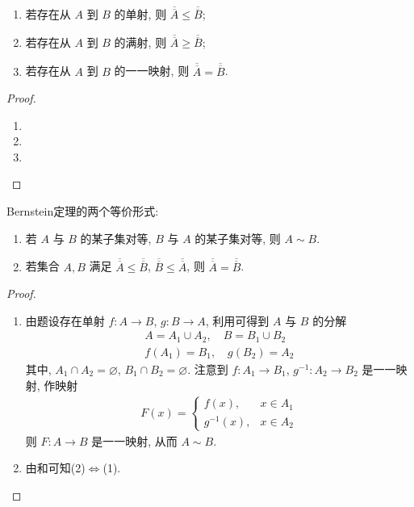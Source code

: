 \documentclass[../../main.tex]{subfiles}
\begin{document}
\begin{proposition}[映射与基数之间的关系]\label{proposition:映射与基数之间的关系}
\begin{enumerate}[(1)]
\item 若存在从 $A$ 到 $B$ 的单射, 则 $\overline{\overline{A}} \leqslant \overline{\overline{B}}$;
\item 若存在从 $A$ 到 $B$ 的满射, 则 $\overline{\overline{A}} \geqslant \overline{\overline{B}}$;
\item 若存在从 $A$ 到 $B$ 的一一映射, 则 $\overline{\overline{A}} = \overline{\overline{B}}$.
\end{enumerate}
\end{proposition}
\begin{proof}
\begin{enumerate}[(1)]
\item 

\item 

\item 
\end{enumerate}
\end{proof}

\begin{theorem}[Bernstein定理]\label{theorem:Bernstein定理}
Bernstein定理的两个等价形式:
\begin{enumerate}[(1)]
\item 若 $A$ 与 $B$ 的某子集对等, $B$ 与 $A$ 的某子集对等, 则 $A \sim B$.

\item 若集合 $A, B$ 满足 $\overline{\overline{A}} \leqslant \overline{\overline{B}}$, $\overline{\overline{B}} \leqslant \overline{\overline{A}}$, 则 $\overline{\overline{A}} = \overline{\overline{B}}$. 
\end{enumerate}
\end{theorem}
\begin{proof}
\begin{enumerate}[(1)]
\item 由题设存在单射 $f : A \to B$, $g : B \to A$, 利用可得到 $A$ 与 $B$ 的分解
\begin{align*}
A = A_1 \cup A_2, \quad B = B_1 \cup B_2\\
f(A_1) = B_1, \quad g(B_2) = A_2
\end{align*}
其中, $A_1 \cap A_2 = \varnothing$, $B_1 \cap B_2 = \varnothing$. 注意到 $f : A_1 \to B_1$, $g^{-1} : A_2 \to B_2$ 是一一映射, 作映射
\begin{align*}
F(x) = 
\begin{cases}
f(x), & x \in A_1\\
g^{-1}(x), & x \in A_2
\end{cases}
\end{align*}
则 $F : A \to B$ 是一一映射, 从而 $A \sim B$.

\item 由和可知(2)$\Leftrightarrow$(1).
\end{enumerate}
\end{proof}
\end{document}
